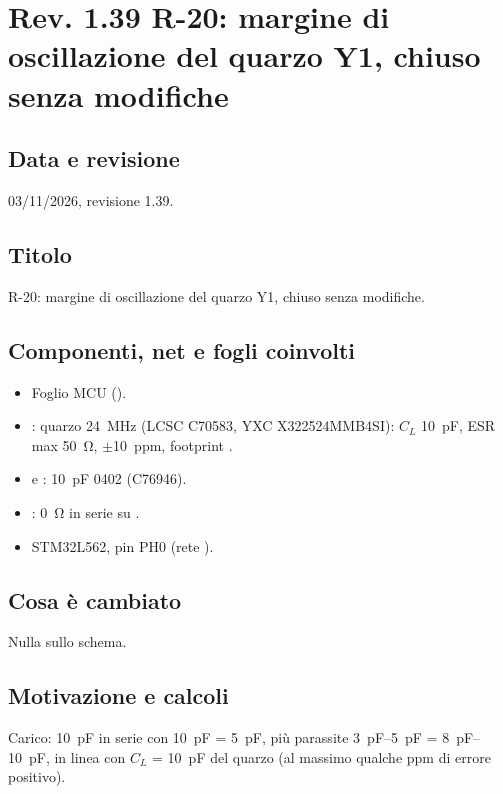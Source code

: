 \clearpage
\section[Rev. 1.39 -- R-20: margine di oscillazione del quarzo Y1]{Rev. 1.39 \textendash{} R-20: margine di oscillazione del quarzo Y1, chiuso senza modifiche}

\subsection{Data e revisione}
03/11/2026, revisione 1.39.

\subsection{Titolo}
R-20: margine di oscillazione del quarzo Y1, chiuso senza modifiche.

\subsection{Componenti, net e fogli coinvolti}
\begin{itemize}
\item Foglio MCU ().
\item {}: quarzo \SI{24}{\mega\hertz} (LCSC C70583, YXC X322524MMB4SI): $C_L$ \SI{10}{\pico\farad}, ESR max \SI{50}{\ohm}, $\pm$\SI{10}{ppm}, footprint .
\item {} e : \SI{10}{\pico\farad} 0402 (C76946).
\item {}: \SI{0}{\ohm} in serie su .
\item {} STM32L562, pin PH0 (rete ).
\end{itemize}

\subsection{Cosa è cambiato}
Nulla sullo schema.

\subsection{Motivazione e calcoli}
Carico: \SI{10}{\pico\farad} in serie con \SI{10}{\pico\farad} = \SI{5}{\pico\farad}, più parassite \SIrange{3}{5}{\pico\farad} = \SIrange{8}{10}{\pico\farad}, in linea con $C_L$ = \SI{10}{\pico\farad} del quarzo (al massimo qualche ppm di errore positivo).

